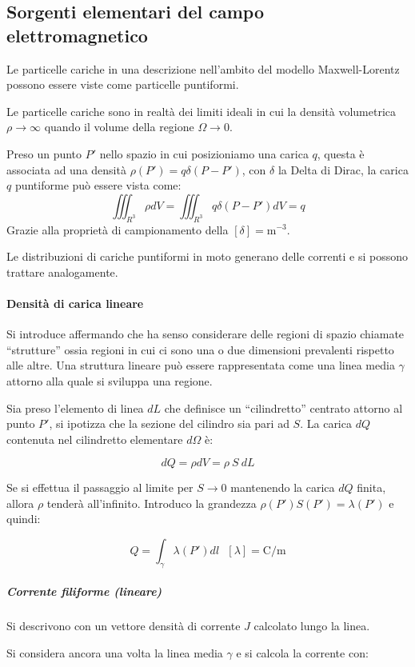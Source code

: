 
\subsection{Sorgenti elementari del campo elettromagnetico}
Le particelle cariche in una descrizione nell'ambito del modello Maxwell-Lorentz possono 
essere viste come particelle puntiformi.

Le particelle cariche sono in realtà dei limiti ideali in cui la densità volumetrica 
$\rho\to \infty$ quando il volume della regione $\Omega \to 0$.

Preso un punto $P'$ nello spazio in cui posizioniamo una carica $q$, questa è associata ad una densità
$\rho(P') = q\delta(P-P')$, con $\delta$ la Delta di Dirac,
la carica $q$ puntiforme può essere vista come:
$$
\iiint_{R^3} \rho dV = \iiint_{R^3} q\delta(P-P')dV = q
$$
Grazie alla proprietà di campionamento della $[\delta]= \si{\meter^{-3}}$.

Le distribuzioni di cariche puntiformi in moto generano delle correnti e si possono trattare 
analogamente.

\paragraph{Densità di carica lineare}
Si introduce affermando che ha senso considerare delle regioni di spazio chiamate ``strutture''
ossia regioni in cui ci sono una o due dimensioni prevalenti rispetto alle altre.
Una struttura lineare può essere rappresentata come una linea media $\gamma$ attorno alla quale
si sviluppa una regione.

Sia preso l'elemento di linea $dL$ che definisce un ``cilindretto'' centrato attorno
al punto $P'$, si ipotizza che la sezione del cilindro sia pari ad $S$.
La carica $dQ$ contenuta nel cilindretto elementare $d\Omega$ è:

$$
dQ = \rho dV = \rho\ S\ dL
$$

Se si effettua il passaggio al limite per $S\to 0 $ mantenendo la carica $dQ$ finita, allora $\rho$
tenderà all'infinito.
Introduco la grandezza $\rho(P') S(P') = \lambda(P')$ e quindi:

$$
Q  = \int_\gamma \lambda(P') dl\ \ \ [\lambda] = \si{\coulomb/\meter}
$$
\subparagraph{Corrente filiforme (lineare)}

Si descrivono con un vettore densità di corrente $J$ calcolato lungo la linea.

Si considera ancora una volta la linea media $\gamma$ e si calcola la corrente con:

